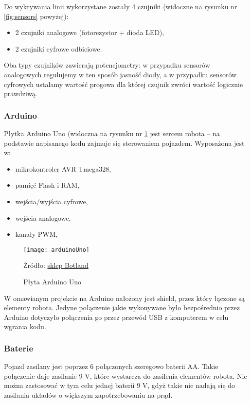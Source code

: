 \documentclass[11pt]{article}
\begin{document}
Do wykrywania linii wykorzystane zostały 4 czujniki (widoczne na rysunku nr \ref{fig:sensors} powyżej):
\begin{itemize}
\item 2 czujniki analogowe (fotorezystor + dioda LED),
\item 2 czujniki cyfrowe odbiciowe.
\end{itemize}

Oba typy czujników zawierają potencjometry: w przypadku sensorów analogowych regulujemy w ten sposób jasność diody, a w przypadku sensorów cyfrowych ustalamy wartość progowa dla której czujnik zwróci wartość logicznie prawdziwą.

\subsubsection*{Arduino}

Płytka Arduino Uno (widoczna na rysunku nr \ref{fig:arduino} jest sercem robota -- na podstawie napisanego kodu zajmuje się sterowaniem pojazdem. Wyposażona jest w:
\begin{itemize}
\item mikrokontroler AVR Tmega328,
\item pamięć Flash i RAM,
\item wejścia/wyjścia cyfrowe,
\item wejścia analogowe,
\item kanały PWM,
\end{itemize}

\begin{figure}[h!]
	\centering
	\texttt{[image: arduinoUno]}
	\caption{Płyta Arduino Uno \label{fig:arduino}}
	Źródło: \href{https://botland.com.pl/arduino-moduly-glowne/1060-arduino-uno-rev3-a000066-8058333490090.html}{sklep Botland}
\end{figure}

W omawianym projekcie na Arduino nałożony jest shield, przez który łączone są elementy robota. Jedyne połączenie jakie wykonywane było bezpośrednio przez Arduino dotyczyło połączenia go przez przewód USB z komputerem w celu wgrania kodu.

\subsubsection*{Baterie}

Pojazd zasilany jest poprzez 6 połączonych szeregowo baterii AA. Takie połączenie daje zasilanie 9 V, które wystarcza do zasilenia elementów robota. Nie można zastosować w tym celu jednej baterii 9 V, gdyż takie nie nadają się do zasilania układów o większym zapotrzebowaniu na prąd.
\end{document}
